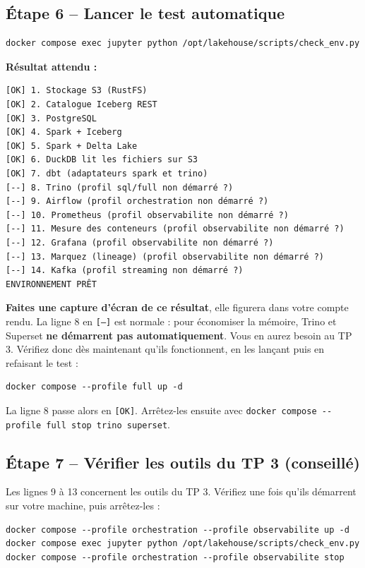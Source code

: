 \documentclass[11pt,a4paper]{article}
\newenvironment{resultat}{\par\medskip\noindent\textbf{Résultat attendu :}\ }{\par\medskip}
\newcommand{\cmd}[1]{\texttt{#1}}
\begin{document}
\subsection*{Étape 6 -- Lancer le test automatique}
\begin{lstlisting}[style=shell]
docker compose exec jupyter python /opt/lakehouse/scripts/check_env.py
\end{lstlisting}

\begin{resultat}
\begin{lstlisting}[basicstyle=\ttfamily\footnotesize,backgroundcolor=\color{white},frame=none]
[OK] 1. Stockage S3 (RustFS)
[OK] 2. Catalogue Iceberg REST
[OK] 3. PostgreSQL
[OK] 4. Spark + Iceberg
[OK] 5. Spark + Delta Lake
[OK] 6. DuckDB lit les fichiers sur S3
[OK] 7. dbt (adaptateurs spark et trino)
[--] 8. Trino (profil sql/full non démarré ?)
[--] 9. Airflow (profil orchestration non démarré ?)
[--] 10. Prometheus (profil observabilite non démarré ?)
[--] 11. Mesure des conteneurs (profil observabilite non démarré ?)
[--] 12. Grafana (profil observabilite non démarré ?)
[--] 13. Marquez (lineage) (profil observabilite non démarré ?)
[--] 14. Kafka (profil streaming non démarré ?)
ENVIRONNEMENT PRÊT
\end{lstlisting}
\textbf{Faites une capture d'écran de ce résultat}, elle figurera dans votre compte rendu.
La ligne 8 en \texttt{[--]} est normale : pour économiser la mémoire, Trino et Superset
\textbf{ne démarrent pas automatiquement}. Vous en aurez besoin au TP 3. Vérifiez donc dès
maintenant qu'ils fonctionnent, en les lançant puis en refaisant le test :
\begin{lstlisting}[style=shell]
docker compose --profile full up -d
\end{lstlisting}
La ligne 8 passe alors en \texttt{[OK]}. Arrêtez-les ensuite avec
\cmd{docker compose -{}-profile full stop trino superset}.
\end{resultat}

\subsection*{Étape 7 -- Vérifier les outils du TP 3 (conseillé)}
Les lignes 9 à 13 concernent les outils du TP 3. Vérifiez une fois qu'ils démarrent sur votre
machine, puis arrêtez-les :
\begin{lstlisting}[style=shell]
docker compose --profile orchestration --profile observabilite up -d
docker compose exec jupyter python /opt/lakehouse/scripts/check_env.py
docker compose --profile orchestration --profile observabilite stop
\end{lstlisting}
\end{document}
